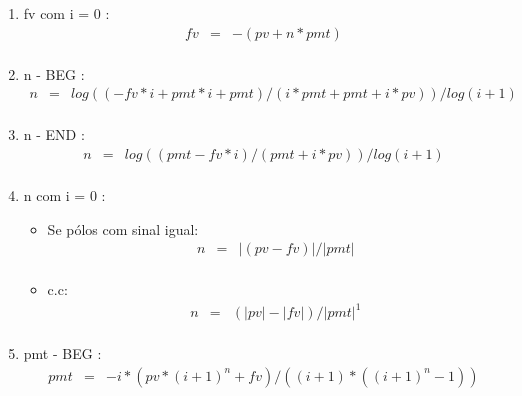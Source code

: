 \begin{enumerate}

\item fv com i = 0 \cite{arachnoid2}:
\begin{eqnarray*}
 fv &=& - (pv + n*pmt) \\
\end{eqnarray*}
 

\item  n - BEG \cite{arachnoid}:
\begin{eqnarray*}
 n &=& log( (-fv*i + pmt*i + pmt) / (i*pmt + pmt + i*pv) ) / log(i+1) \\
\end{eqnarray*} 


\item  n - END \cite{arachnoid}: 
\begin{eqnarray*}
 n &=& log( (pmt - fv*i) / (pmt + i*pv) ) / log(i+1) \\
\end{eqnarray*} 
  

\item  n com i = 0 \cite{arachnoid2}: 

\begin{itemize}
 \item Se pólos com sinal igual:
	\begin{eqnarray*}
 		 n &=& |(pv - fv)| / |pmt| \\ 		
	\end{eqnarray*}
  \item c.c:
	\begin{eqnarray*}
 		n &=& (|pv| - |fv|) / |pmt|   ^{1} \\	 
	\end{eqnarray*}
\end{itemize}
 

\item  pmt - BEG \cite{arachnoid}: 
\begin{eqnarray*}
	pmt &=& - i*( pv* ( i+1 )^{n} + fv ) / ( (i+1)*( (i+1)^{n} - 1 ) ) \\
\end{eqnarray*} 
 

\end{enumerate}
